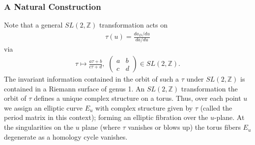 \documentclass[12pt, onecolumn]{article}
\begin{document}
\subsubsection{A Natural Construction}
Note that a general $SL(2,\mathbb{Z})$ transformation acts on
\begin{align*}
\tau(u)=\frac{da_{D}/du}{da/du}
\end{align*}
via
\begin{align*}
\tau \mapsto \frac{a \tau +b}{c \tau +d},\,\,
\left(
\begin{array}{cc}
a & b\\
c & d
\end{array}
\right) \in SL(2,\mathbb{Z}).
\end{align*}
The invariant information contained in the orbit of such a $\tau$ under $SL(2,\mathbb{Z})$ is contained in a Riemann surface of genus 1.  An $SL(2,\mathbb{Z})$ transformation  the orbit of $\tau$ defines a unique complex structure on a torus.  Thus, over each point $u$ we assign an elliptic curve $E_{u}$ with complex structure given by $\tau$ (called the period matrix in this context); forming an elliptic fibration over the $u$-plane.  At the singularities on the $u$ plane (where $\tau$ vanishes or blows up) the torus fibers $E_{u}$ degenerate as a homology cycle vanishes.  


\vspace{5mm}
\end{document}
